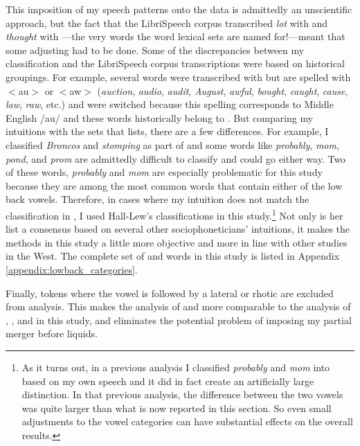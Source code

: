 This imposition of my speech patterns onto the data is admittedly an unscientific approach, but the fact that the LibriSpeech corpus transcribed \textit{lot} with \thought and \textit{thought} with \lot---the very words the word lexical sets are named for!---meant that some adjusting had to be done. Some of the discrepancies between my classification and the LibriSpeech corpus transcriptions were based on historical groupings. For example, several words were transcribed with \lot but are spelled with $<$au$>$ or $<$aw$>$ (\textit{auction}, \textit{audio}, \textit{audit}, \textit{August}, \textit{awful}, \textit{bought}, \textit{caught}, \textit{cause}, \textit{law}, \textit{raw}, etc.) and were switched because this spelling corresponds to Middle English /au/ and these words historically belong to \thought \citep[115]{wells_1982}. But comparing my intuitions with the sets that \citet[133--134]{hall_lew_2009_diss} lists, there are a few differences. For example, I classified \textit{Broncos} and \textit{stomping} as part of \thought and some words like \textit{probably}, \textit{mom}, \textit{pond}, and \textit{prom} are admittedly difficult to classify and could go either way. Two of these words, \textit{probably} and \textit{mom} are especially problematic for this study because they are among the most common words that contain either of the low back vowels. Therefore, in cases where my intuition does not match the classification in \citet[133--134]{hall_lew_2009_diss}, I used Hall-Lew's classifications in this study.\footnote{As it turns out, in a previous analysis I classified \textit{probably} and \textit{mom} into \thought based on my own speech and it did in fact create an artificially large distinction. In that previous analysis, the difference between the two vowels was quite larger than what is now reported in this section. So even small adjustments to the vowel categories can have substantial effects on the overall results.} Not only is her list a consensus based on several other sociophoneticians' intuitions, it makes the methods in this study a little more objective and more in line with other studies in the West. The complete set of \lot and \thought words in this study is listed in Appendix \ref{appendix:lowback_categories}.

Finally, tokens where the vowel is followed by a lateral or rhotic are excluded from analysis. This makes the analysis of \lot and \thought more comparable to the analysis of \trap, \dress, and \kit in this study, and eliminates the potential problem of imposing my partial merger before liquids.



